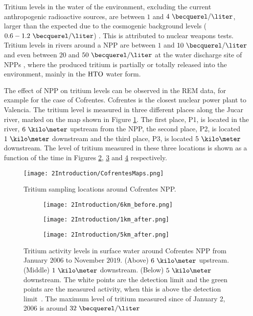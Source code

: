 Tritium levels in the water of the environment, excluding the current anthropogenic radioactive sources, are between $1$ and $4~\becquerel/\liter$, larger than the expected due to the cosmogenic background levels ($0.6-1.2~\becquerel/\liter$) \cite{FranceTritiumEnvironment}. This is attributed to nuclear weapons tests. Tritium levels in rivers around a NPP are between $1$ and $10~\becquerel/\liter$ and even between $20$ and $50~\becquerel/\liter$ at the water discharge site of NPPs \cite{FranceTritiumEnvironment}, where the produced tritium is partially or totally released into the environment, mainly in the $\ce{HTO}$ water form.

The effect of NPP on tritium levels can be observed in the REM data, for example for the case of Cofrentes. Cofrentes is the closest nuclear power plant to Valencia. The tritium level is measured in three different places along the Jucar river, marked on the map shown in Figure \ref{fig:SamplingLocations}. The first place, P1, is located in the river, $6~\kilo\meter$ upstream from the NPP, the second place, P2, is located $1~\kilo\meter$ downstream and the third place, P3, is located $5~\kilo\meter$ downstream. The level of tritium measured in these three locations is shown as a function of the time in Figures \ref{subfig:TritiumL6kB}, \ref{subfig:TritiumL1kA} and \ref{subfig:TritiumL5kA} respectively.

\begin{figure}[hbtp]
\texttt{[image: 2Introduction/CofrentesMaps.png]}
\centering
\caption{Tritium sampling locations around Cofrentes NPP.\label{fig:SamplingLocations}}
\end{figure}

\begin{figure}
\centering
    \begin{subfigure}[b]{0.7\textwidth}
    \centering
    \texttt{[image: 2Introduction/6km\_before.png]}  
    \caption{\label{subfig:TritiumL6kB}}
    \end{subfigure}
    \hfill
    \begin{subfigure}[b]{0.7\textwidth}
    \centering
    \texttt{[image: 2Introduction/1km\_after.png]}  
    \caption{\label{subfig:TritiumL1kA}}
    \end{subfigure}
    \hfill
    \begin{subfigure}[b]{0.7\textwidth}
    \centering
    \texttt{[image: 2Introduction/5km\_after.png]}  
    \caption{\label{subfig:TritiumL5kA}}
    \end{subfigure}
 \caption{Tritium activity levels in surface water around Cofrentes NPP from January $2006$ to November $2019$. (Above) $6~\kilo\meter$ upstream. (Middle) $1~\kilo\meter$ downstream. (Below) $5~\kilo\meter$ downstream. The white points are the detection limit and the green points are the measured activity, when this is above the detection limit~\cite{REM}. The maximum level of tritium measured since of January 2, 2006 is around $32~\becquerel/\liter$}
 \label{subfig:MeasurementsCofrentesSurface}
\end{figure}


